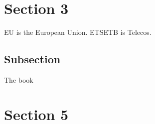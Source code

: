 \documentclass[a4paper,12pt]{article}
\begin{document}


\newpage
\tableofcontents

\newpage
\listoffigures
\lstlistoflistings
\listoftables

\newpage
\printacronyms[include=abbrev,name=Abbreviations]

\newpage


\newpage


\newpage



\clearpage






\newpage
\section{Section 3}
\label{sec:sec3}

\lipsum[4] \ac{EU} is the European Union. \lipsum[5]
\lipsum[6] \ac{ETSETB} is Telecos. \lipsum[7]

\subsection{Subsection}
\label{sec:subsec3.1}
The book \cite{latexcompanion} \lipsum[15]





\newpage
\section{Section 5}
\label{sec:sect5}
\lipsum[4]
\end{document}
